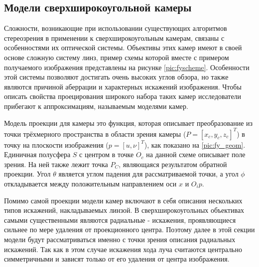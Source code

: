 \subsection{Модели сверхширокоугольной камеры}
\label{camera_model}
Сложности, возникающие при использовании существующих алгоритмов стереозрения  в применении к сверхширокоугольным камерам, связаны с
 особенностями их оптической системы. Объективы  этих камер имеют в своей основе сложную систему линз, пример схемы которой вместе с примером
 получаемого изображения представлены на рисунке \ref{pic:fyscheme}. Особенности этой системы позволяют достигать очень высоких углов обзора,
  но также являются причиной аберрации и характерных искажений изображения. Чтобы описать свойства проецирования широкого набора таких
камер исследователи прибегают к аппроксимациям, называемым моделями камер. 


Модель проекции для камеры это функция, которая описывает преобразование из точки трёхмерного пространства  в области зрения 
камеры ($P=[x_c, y_c, z_c]^T$) в точку на плоскости изображения ($p=[u, \nu]^T$), как показано на \ref{pic:fy_geom}. Единичная            %
полусфера $S$ с центром в точке $O_c$ на данной схеме описывает поле зрения. На ней также лежит точка $P_C$, являющаяся результатом обратной проекции.    %
Угол $\theta$ является углом падения для рассматриваемой точки, а угол $\phi$ откладывается между положительным направлением оси $x$ и $O_{i}{p}$. 


Помимо самой проекции модели камер включают в себя описания нескольких типов искажений, накладываемых линзой. В сверхширокоугольных объективах самыми существенными являются 
радиальные - искажения, проявляющиеся сильнее по мере удаления от проекционного центра. Поэтому далее в этой секции модели будут рассматриваться именно с точки зрения 
описания радиальных искажений. Так как в этом случае искажения хода луча считаются центрально симметричными и зависят только от его удаления от центра изображения. 


